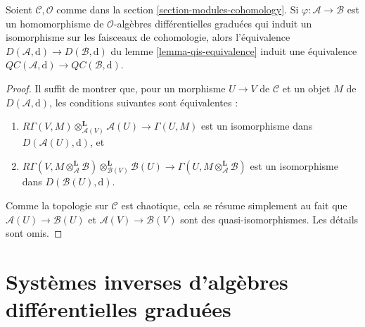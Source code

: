 \begin{lemma}
\label{lemma-cartesian-qis-equivalence}
Soient $\mathcal{C}, \mathcal{O}$ comme dans la section \ref{section-modules-cohomology}.
Si $\varphi : \mathcal{A} \to \mathcal{B}$ est un homomorphisme de $\mathcal{O}$-algèbres différentielles graduées qui induit un isomorphisme sur les faisceaux de cohomologie, alors l'équivalence $D(\mathcal{A}, \text{d}) \to D(\mathcal{B}, \text{d})$ du lemme \ref{lemma-qis-equivalence}  induit une équivalence $\mathit{QC}(\mathcal{A}, \text{d}) \to \mathit{QC}(\mathcal{B}, \text{d})$.
\end{lemma}

\begin{proof}
Il suffit de montrer que, pour un morphisme $U \to V$ de $\mathcal{C}$ et un objet $M$ de $D(\mathcal{A}, \text{d})$, les conditions suivantes sont équivalentes :
\begin{enumerate}
\item $R\Gamma(V, M) \otimes_{\mathcal{A}(V)}^\mathbf{L} \mathcal{A}(U) \to \Gamma(U, M)$ est un isomorphisme dans $D(\mathcal{A}(U), \text{d})$, et
\item $R\Gamma(V, M \otimes_\mathcal{A}^\mathbf{L} \mathcal{B}) \otimes_{\mathcal{B}(V)}^\mathbf{L} \mathcal{B}(U) \to \Gamma(U, M \otimes_\mathcal{A}^\mathbf{L} \mathcal{B})$ est un isomorphisme dans $D(\mathcal{B}(U), \text{d})$.
\end{enumerate}
Comme la topologie sur $\mathcal{C}$ est chaotique, cela se résume simplement au fait que $\mathcal{A}(U) \to \mathcal{B}(U)$ et $\mathcal{A}(V) \to \mathcal{B}(V)$ sont des quasi-isomorphismes.
Les détails sont omis.
\end{proof}






\section{Systèmes inverses d'algèbres différentielles graduées}
\label{section-qc-inverse-system}

